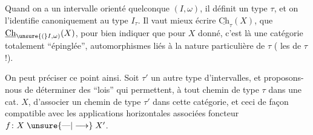 Quand on a un intervalle orienté quelconque $(I,\omega)$, il définit un type $\tau$, et on l'identifie canoniquement au type $I_\tau$. Il  vaut mieux écrire $\underline{\mathrm{Ch}}_\tau(X)$,  que $\underline{\mathrm{Ch}}_{\unsure{(}I,\omega)}(X)$, pour bien indiquer que pour $X$ donné, c'est là une catégorie totalement ``épinglée'',  automorphismes liés à la nature particulière de $\tau$ ( les  de $\tau$ !).

On peut préciser ce point ainsi. Soit $\tau'$ un autre type d'intervalles, et proposons-nous de déterminer des  ``lois'' qui permettent, à tout  chemin de type $\tau$ dans une cat.  $X$, d'associer un chemin de type $\tau'$ dans cette  catégorie, et ceci de façon  compatible avec les  applications horizontales
associées   foncteur $f\colon X\mathrel{\unsure{\text{---}|\longrightarrow}}X'$.

